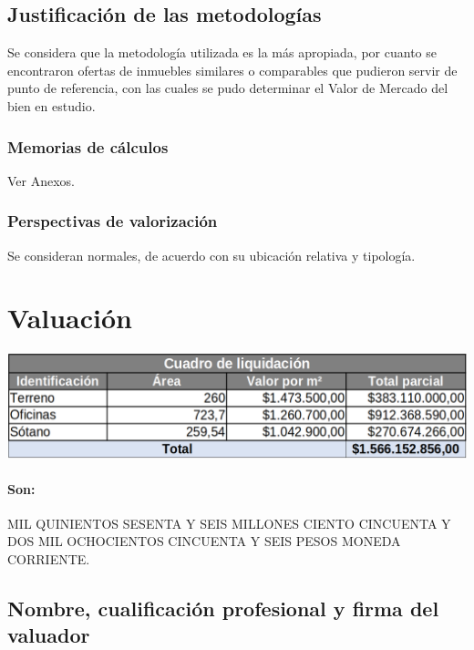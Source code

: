 \documentclass[12pt,a4paper,twoside]{article}
\begin{document}
{\subsection{Justificación de las metodologías}

Se considera que la metodología utilizada es la más apropiada, por cuanto se encontraron ofertas de inmuebles similares o comparables que pudieron servir de punto de referencia, con las cuales se pudo determinar el Valor de Mercado del bien en estudio. 

\subsubsection{Memorias de cálculos}

Ver Anexos.

\subsubsection{Perspectivas de valorización}

Se consideran normales, de acuerdo con su ubicación relativa y tipología.


\newpage

\section{Valuación}

\begin{center}
	\includegraphics[width=\textwidth]{Imagenes/Valoracion1}
\end{center}

\paragraph{Son: } MIL QUINIENTOS SESENTA Y SEIS MILLONES CIENTO CINCUENTA Y DOS MIL OCHOCIENTOS CINCUENTA Y SEIS  PESOS MONEDA CORRIENTE.

\subsection{Nombre, cualificación profesional y firma del valuador}


}
\end{document}
